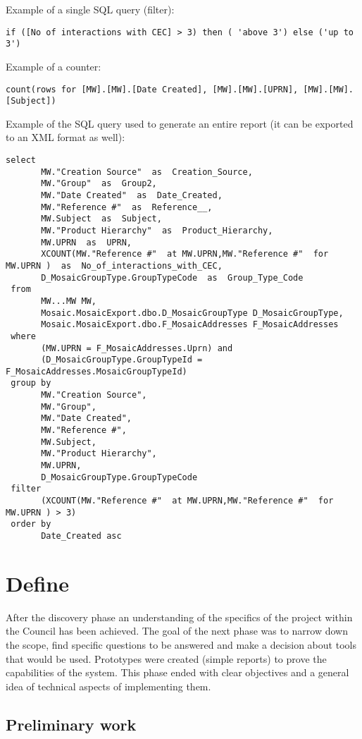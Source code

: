 Example of a single SQL query (filter):
\begin{lstlisting}
if ([No of interactions with CEC] > 3) then ( 'above 3') else ('up to 3')
\end{lstlisting}
Example of a counter:
\begin{lstlisting}
count(rows for [MW].[MW].[Date Created], [MW].[MW].[UPRN], [MW].[MW].[Subject])
\end{lstlisting}
Example of the SQL query used to generate an entire report (it can be exported to an XML format as well):
\begin{lstlisting}
select 
       MW."Creation Source"  as  Creation_Source,
       MW."Group"  as  Group2,
       MW."Date Created"  as  Date_Created,
       MW."Reference #"  as  Reference__,
       MW.Subject  as  Subject,
       MW."Product Hierarchy"  as  Product_Hierarchy,
       MW.UPRN  as  UPRN,
       XCOUNT(MW."Reference #"  at MW.UPRN,MW."Reference #"  for MW.UPRN )  as  No_of_interactions_with_CEC,
       D_MosaicGroupType.GroupTypeCode  as  Group_Type_Code
 from 
       MW...MW MW,
       Mosaic.MosaicExport.dbo.D_MosaicGroupType D_MosaicGroupType,
       Mosaic.MosaicExport.dbo.F_MosaicAddresses F_MosaicAddresses
 where 
       (MW.UPRN = F_MosaicAddresses.Uprn) and 
       (D_MosaicGroupType.GroupTypeId = F_MosaicAddresses.MosaicGroupTypeId)
 group by 
       MW."Creation Source",
       MW."Group",
       MW."Date Created",
       MW."Reference #",
       MW.Subject,
       MW."Product Hierarchy",
       MW.UPRN,
       D_MosaicGroupType.GroupTypeCode
 filter 
       (XCOUNT(MW."Reference #"  at MW.UPRN,MW."Reference #"  for MW.UPRN ) > 3)
 order by 
       Date_Created asc
\end{lstlisting}

	\section{Define}
	
After the discovery phase an understanding of the specifics of the project within the Council has been achieved. The goal of the next phase was to narrow down the scope, find specific questions to be answered and make a decision about tools that would be used. Prototypes were created (simple reports) to prove the capabilities of the system. This phase ended with clear objectives and a general idea of technical aspects of implementing them.	
	
		\subsection{Preliminary work}
		
